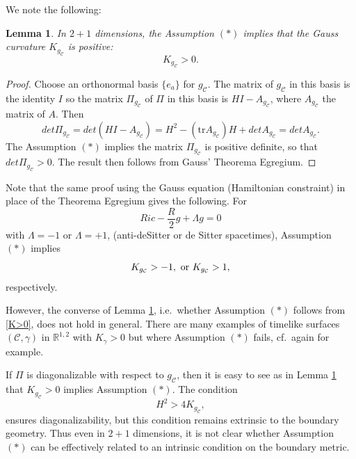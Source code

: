 \documentclass[10pt]{amsart}
\newcommand{\g}{\gamma}
\newcommand{\cC}{{\mathcal C}}
\newcommand{\bR}{\mathbb R}
\newcommand{\be}{\begin{equation}}
\newcommand{\ee}{\end{equation}}
\newcommand{\tr}{\mathrm{tr}}
\newcommand{\<}{\langle}
\renewcommand{\>}{\rangle}
\theoremstyle{plain}
\newtheorem{lemma}{Lemma}[section]
\theoremstyle{remark}
\theoremstyle{definition}
\numberwithin{equation}{section}
\begin{document}
   We note the following: 
 
 \begin{lemma} \label{21}
In $2+1$ dimensions, the Assumption $(*)$ implies that the Gauss curvature $K_{g_{\cC}}$ is positive:  
\be \label{K>0}
K_{g_{\cC}} > 0.
\ee
\end{lemma}

\begin{proof}
Choose an orthonormal basis $\{e_{a}\}$ for $g_{\cC}$. The matrix of $g_{\cC}$ in this basis is the identity $I$ so the matrix $\Pi_{g_{\cC}}$ of $\Pi$ in 
this basis is $HI - A_{g_{\cC}}$, where $A_{g_{\cC}}$ the matrix of $A$. Then 
$$det \Pi_{g_{\cC}}  = det(HI - A_{g_{\cC}} ) = H^2 - (\tr A_{g_{\cC}})H + det A_{g_{\cC}} = det A_{g_{\cC}}.$$
The Assumption $(*)$ implies the matrix $\Pi_{g_{\cC}}$ is positive definite, so that $det \Pi_{g_{\cC}} > 0$. The result then follows from Gauss' Theorema 
Egregium.

\end{proof} 

  Note that the same proof using the Gauss equation (Hamiltonian constraint) in place of the Theorema Egregium gives the following. For 
$$Ric - \frac{R}{2}g + \Lambda g = 0$$
with $\Lambda = -1$ or $\Lambda = +1$, (anti-deSitter or de Sitter spacetimes), Assumption $(*)$ implies 
$$K_{g_{\cC}} > -1, \ {\rm or} \  K_{g_{\cC}} > 1,$$
respectively. 

  However, the converse of Lemma \ref{21}, i.e.~whether Assumption $(*)$ follows from \eqref{K>0}, does not hold in general. There are many examples 
of timelike surfaces $(\cC, \g)$ in $\bR^{1,2}$ with $K_{\g} > 0$ but where Assumption $(*)$ fails, cf.~again \cite{Lop} for example. 

  If $\Pi$ is diagonalizable with respect to $g_{\cC}$, then it is easy to see as in Lemma \ref{21} that $K_{g_{\cC}} > 0$ implies Assumption $(*)$. The condition 
$$H^2 > 4K_{g_{\cC}},$$
ensures diagonalizability, but this condition remains extrinsic to the boundary geometry. Thus even in $2+1$ dimensions, it is not clear whether Assumption $(*)$ 
can be effectively related to an intrinsic condition on the boundary metric. 

\medskip 
\end{document}
